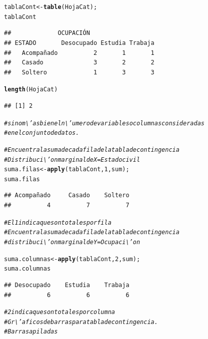 \documentclass[12pt,letterpaper]{article}\usepackage[]{graphicx}\usepackage[]{color}
\makeatletter
\newcommand{\hlnum}[1]{\textcolor[rgb]{0.686,0.059,0.569}{#1}}%
\newcommand{\hlcom}[1]{\textcolor[rgb]{0.678,0.584,0.686}{\textit{#1}}}%
\newcommand{\hlstd}[1]{\textcolor[rgb]{0.345,0.345,0.345}{#1}}%
\newcommand{\hlkwb}[1]{\textcolor[rgb]{0.69,0.353,0.396}{#1}}%
\newcommand{\hlkwd}[1]{\textcolor[rgb]{0.737,0.353,0.396}{\textbf{#1}}}%
\newenvironment{kframe}{%
 \def\at@end@of@kframe{}%
 \ifinner\ifhmode%
  \def\at@end@of@kframe{\end{minipage}}%
  \begin{minipage}{\columnwidth}%
 \fi\fi%
 \def\FrameCommand##1{\hskip\@totalleftmargin \hskip-\fboxsep
 \colorbox{shadecolor}{##1}\hskip-\fboxsep
     \hskip-\linewidth \hskip-\@totalleftmargin \hskip\columnwidth}%
 \MakeFramed {\advance\hsize-\width
   \@totalleftmargin\z@ \linewidth\hsize
   \@setminipage}}%
 {\par\unskip\endMakeFramed%
 \at@end@of@kframe}
\newenvironment{knitrout}{}{} %
\makeatother
\begin{document}
\begin{knitrout}
\color{fgcolor}\begin{kframe}
\begin{alltt}
\hlstd{tablaCont} \hlkwb{<-} \hlkwd{table}\hlstd{(HojaCat);}
\hlstd{tablaCont}
\end{alltt}
\begin{verbatim}
##             OCUPACIÓN
## ESTADO       Desocupado Estudia Trabaja
##   Acompañado          2       1       1
##   Casado              3       2       2
##   Soltero             1       3       3
\end{verbatim}
\begin{alltt}
\hlkwd{length}\hlstd{(HojaCat)}
\end{alltt}
\begin{verbatim}
## [1] 2
\end{verbatim}
\begin{alltt}
\hlcom{# sino m\textbackslash{}'as bien el n\textbackslash{}'umero de variables o columnas consideradas }
\hlcom{# en el conjunto de datos.}

\hlcom{# Encuentra la suma de cada fila de la tabla de contingencia}
\hlcom{# Distribuci\textbackslash{}'on marginal de X=Estado civil}
\hlstd{suma.filas} \hlkwb{<-} \hlkwd{apply}\hlstd{(tablaCont,} \hlnum{1}\hlstd{, sum);}
\hlstd{suma.filas}
\end{alltt}
\begin{verbatim}
## Acompañado     Casado    Soltero 
##          4          7          7
\end{verbatim}
\begin{alltt}
\hlcom{# El 1 indica que son totales por fila}
\hlcom{# Encuentra la suma de cada fila de la tabla de contingencia}
\hlcom{# distribuci\textbackslash{}'on marginal de Y=Ocupaci\textbackslash{}'on}

\hlstd{suma.columnas} \hlkwb{<-} \hlkwd{apply}\hlstd{(tablaCont,}\hlnum{2}\hlstd{,sum);}
\hlstd{suma.columnas}
\end{alltt}
\begin{verbatim}
## Desocupado    Estudia    Trabaja 
##          6          6          6
\end{verbatim}
\begin{alltt}
\hlcom{# 2 indica que son totales por columna}
\hlcom{# Gr\textbackslash{}'aficos de barras para tabla de contingencia.}
\hlcom{# Barras apiladas}


\end{alltt}
\end{kframe}
\end{knitrout}
\end{document}
